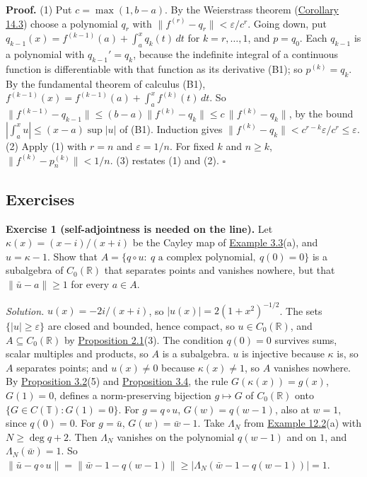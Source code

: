 \documentclass[
  english,
  11pt,
  a4paper,
]{article}
\begin{document}
\textbf{Proof.} (1) Put \(c=\max(1,b-a)\). By the Weierstrass theorem
(\hyperlink{the-stone-weierstrass-theorem-for-functions-vanishing-at-infinity--oa-fnd-sw-14}{Corollary
14.3}) choose a polynomial \(q_r\) with
\(\|f^{(r)}-q_r\|<\varepsilon/c^r\). Going down, put
\(q_{k-1}(x)=f^{(k-1)}(a)+\int_a^xq_k(t)\,dt\) for \(k=r,\dots,1\), and
\(p=q_0\). Each \(q_{k-1}\) is a polynomial with \(q_{k-1}'=q_k\),
because the indefinite integral of a continuous function is
differentiable with that function as its derivative (B1); so
\(p^{(k)}=q_k\). By the fundamental theorem of calculus (B1),
\(f^{(k-1)}(x)=f^{(k-1)}(a)+\int_a^xf^{(k)}(t)\,dt\). So
\(\|f^{(k-1)}-q_{k-1}\|\leq(b-a)\|f^{(k)}-q_k\|\leq c\,\|f^{(k)}-q_k\|\),
by the bound \(|\int_a^xu|\leq(x-a)\sup|u|\) of (B1). Induction gives
\(\|f^{(k)}-q_k\|<c^{r-k}\varepsilon/c^r\leq\varepsilon\). (2) Apply (1)
with \(r=n\) and \(\varepsilon=1/n\). For fixed \(k\) and \(n\geq k\),
\(\|f^{(k)}-p_n^{(k)}\|<1/n\). (3) restates (1) and (2). \(\square\)

\subsection{Exercises}\label{the-stone-weierstrass-theorem-for-functions-vanishing-at-infinity--exercises}

\textbf{Exercise 1 (self-adjointness is needed on the line).} Let
\(\kappa(x)=(x-i)/(x+i)\) be the Cayley map of
\hyperlink{the-stone-weierstrass-theorem-for-functions-vanishing-at-infinity--oa-fnd-sw-02}{Example
3.3}(a), and \(u=\kappa-1\). Show that
\(A=\{q\circ u:\ q\text{ a complex polynomial},\ q(0)=0\}\) is a
subalgebra of \(C_0(\mathbb R)\) that separates points and vanishes
nowhere, but that \(\|\bar u-a\|\geq1\) for every \(a\in A\).

\emph{Solution.} \(u(x)=-2i/(x+i)\), so \(|u(x)|=2(1+x^2)^{-1/2}\). The
sets \(\{|u|\geq\varepsilon\}\) are closed and bounded, hence compact,
so \(u\in C_0(\mathbb R)\), and \(A\subseteq C_0(\mathbb R)\) by
\hyperlink{the-stone-weierstrass-theorem-for-functions-vanishing-at-infinity--oa-fnd-sw-01}{Proposition
2.1}(3). The condition \(q(0)=0\) survives sums, scalar multiples and
products, so \(A\) is a subalgebra. \(u\) is injective because
\(\kappa\) is, so \(A\) separates points; and \(u(x)\neq0\) because
\(\kappa(x)\neq1\), so \(A\) vanishes nowhere. By
\hyperlink{the-stone-weierstrass-theorem-for-functions-vanishing-at-infinity--oa-fnd-sw-02}{Proposition
3.2}(5) and
\hyperlink{the-stone-weierstrass-theorem-for-functions-vanishing-at-infinity--oa-fnd-sw-03}{Proposition
3.4}, the rule \(G(\kappa(x))=g(x)\), \(G(1)=0\), defines a
norm-preserving bijection \(g\mapsto G\) of \(C_0(\mathbb R)\) onto
\(\{G\in C(\mathbb T):G(1)=0\}\). For \(g=q\circ u\), \(G(w)=q(w-1)\),
also at \(w=1\), since \(q(0)=0\). For \(g=\bar u\), \(G(w)=\bar w-1\).
Take \(\Lambda_N\) from
\hyperlink{the-stone-weierstrass-theorem-for-functions-vanishing-at-infinity--oa-fnd-sw-11}{Example
12.2}(a) with \(N\geq\deg q+2\). Then \(\Lambda_N\) vanishes on the
polynomial \(q(w-1)\) and on \(1\), and \(\Lambda_N(\bar w)=1\). So
\(\|\bar u-q\circ u\|=\|\bar w-1-q(w-1)\|\geq|\Lambda_N(\bar w-1-q(w-1))|=1\).
\end{document}
